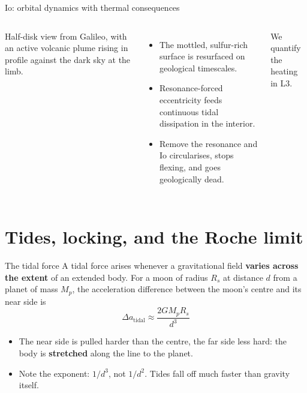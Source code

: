 \documentclass[aspectratio=169, 11pt]{beamer}
\begin{document}
\begin{frame}{Io: orbital dynamics with thermal consequences}
  \begin{columns}[c]
    \column{\recapfigcolnarrow}
    \centering

    \column{\recaptextcolwide}
    Half-disk view from Galileo, with an active volcanic plume rising in profile against the dark sky at the limb.
    \vskip6pt\relax
    \begin{itemize}
      \item The mottled, sulfur-rich surface is resurfaced on geological timescales.
      \item Resonance-forced eccentricity feeds continuous tidal dissipation in the interior.
      \item Remove the resonance and Io circularises, stops flexing, and goes geologically dead.
    \end{itemize}
    \vskip4pt\relax
    We quantify the heating in L3.
  \end{columns}
\end{frame}


\section{Tides, locking, and the Roche limit}

\begin{frame}{The tidal force}
  A tidal force arises whenever a gravitational field \textbf{varies across the extent} of an extended body.
  \vskip6pt\relax
  For a moon of radius $R_s$ at distance $d$ from a planet of mass $M_p$, the acceleration difference between the moon's centre and its near side is
  \[
    \Delta a_{\mathrm{tidal}} \approx \frac{2 G M_p R_s}{d^3}
  \]
  \vskip6pt\relax
  \begin{itemize}
    \item The near side is pulled harder than the centre, the far side less hard: the body is \textbf{stretched} along the line to the planet.
    \item Note the exponent: $1/d^3$, not $1/d^2$. Tides fall off much faster than gravity itself.
  \end{itemize}
  \vskip2pt\relax
\end{frame}
\end{document}
